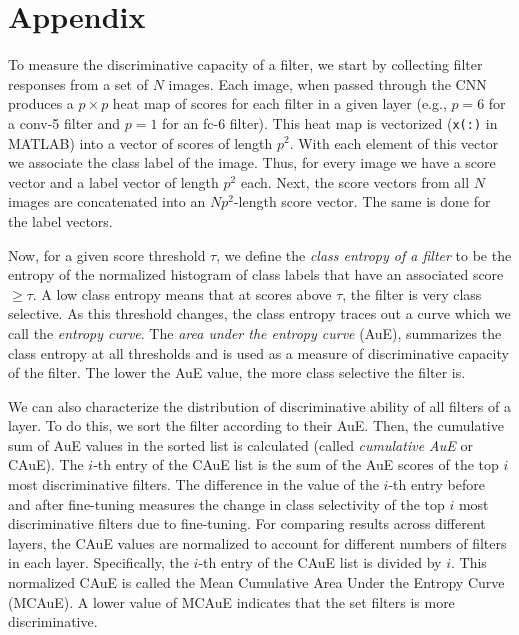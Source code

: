\section*{Appendix}
\label{sub:app-entropy}
To measure the discriminative capacity of a filter, we start by collecting filter responses from a set of $N$ images.
Each image, when passed through the CNN produces a $p \times p$ heat map of scores for each filter in a given layer (e.g., $p = 6$ for a conv-5 filter and $p = 1$ for an fc-6 filter).
This heat map is vectorized (\texttt{x(:)} in MATLAB) into a vector of scores of length $p^2$. With each element of this vector we associate the class label of the image. 
Thus, for every image we have a score vector and a label vector of length $p^2$ each.
Next, the score vectors from all $N$ images are concatenated into an $Np^2$-length score vector.
The same is done for the label vectors.

Now, for a given score threshold $\tau$, we define the \emph{class entropy of a filter} to be the entropy of the normalized histogram of class labels that have an associated score $\geq \tau$.
A low class entropy means that at scores above $\tau$, the filter is very class selective.
As this threshold changes, the class entropy traces out a curve which we call the \emph{entropy curve}.
The \emph{area under the entropy curve} (AuE), summarizes the class entropy at all thresholds and is used as a measure of discriminative capacity of the filter. 
The lower the AuE value, the more class selective the filter is.

We can also characterize the distribution of discriminative ability of all filters of a layer.
To do this, we sort the filter according to their AuE.
Then, the cumulative sum of AuE values in the sorted list is calculated (called \emph{cumulative AuE} or CAuE). 
The $i$-th entry of the CAuE list is the sum of the AuE scores of the top $i$ most discriminative filters.
The difference in the value of the $i$-th entry before and after fine-tuning measures the change in class selectivity of the top $i$ most discriminative filters due to fine-tuning.
For comparing results across different layers, the CAuE values are normalized to account for different numbers of filters in each layer. 
Specifically, the $i$-th entry of the CAuE list is divided by $i$. 
This normalized CAuE is called the Mean Cumulative Area Under the Entropy Curve (MCAuE).
A lower value of MCAuE indicates that the set filters is more discriminative.


